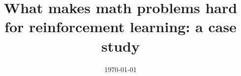 \documentclass{amsart}
\title[What makes math problems hard for RL]{What makes math problems hard for reinforcement learning: a case study}
\date{\today}
\begin{document}
	
	\maketitle
	\tableofcontents
	
	
	
	
	
	
	
	
	\appendix
	
	
	
	
	\sloppy
	\printbibliography
\end{document}
